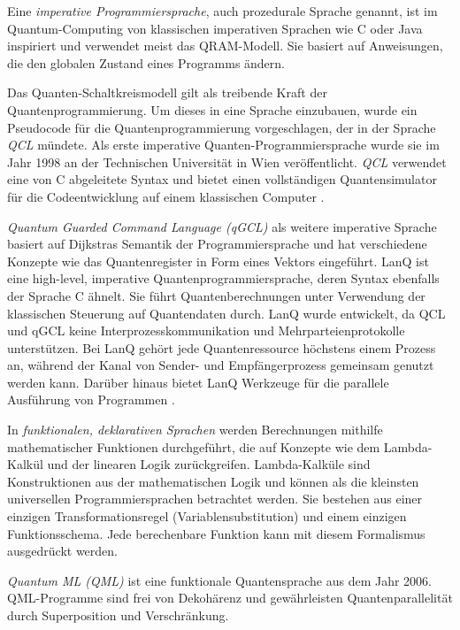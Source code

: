 Eine \textit{imperative Programmiersprache}, auch prozedurale Sprache genannt, ist im Quantum-Computing von klassischen imperativen Sprachen wie C oder Java inspiriert und verwendet meist das QRAM-Modell. Sie basiert auf Anweisungen, die den globalen Zustand eines Programms ändern. \autocite{garhwal_quantum_2021}

Das Quanten-Schaltkreismodell gilt als treibende Kraft der Quantenprogrammierung. Um dieses in eine Sprache einzubauen, wurde ein Pseudocode für die Quantenprogrammierung vorgeschlagen, der in der Sprache \textit{QCL} mündete. Als erste imperative Quanten-Programmiersprache wurde sie im Jahr 1998 an der Technischen Universität in Wien veröffentlicht. \textit{QCL} verwendet eine von C abgeleitete Syntax und bietet einen vollständigen Quantensimulator für die Codeentwicklung auf einem klassischen Computer \autocite{sofgeSurveyQuantumProgramming2008a}.

\textit{Quantum Guarded Command Language (qGCL)} als weitere imperative Sprache basiert auf Dijkstras Semantik der Programmiersprache und hat verschiedene Konzepte wie das Quantenregister in Form eines Vektors eingeführt. LanQ ist eine high-level, imperative Quantenprogrammiersprache, deren Syntax ebenfalls der Sprache C ähnelt. Sie führt Quantenberechnungen unter Verwendung der klassischen Steuerung auf Quantendaten durch. LanQ wurde entwickelt, da QCL und qGCL keine Interprozesskommunikation und Mehrparteienprotokolle unterstützen. Bei LanQ gehört jede Quantenressource höchstens einem Prozess an, während der Kanal von Sender- und Empfängerprozess gemeinsam genutzt werden kann. Darüber hinaus bietet LanQ Werkzeuge für die parallele Ausführung von Programmen \autocite{garhwal_quantum_2021}.

In \textit{funktionalen, deklarativen Sprachen} werden Berechnungen mithilfe mathematischer Funktionen durchgeführt, die auf Konzepte wie dem Lambda-Kalkül und der linearen Logik zurückgreifen. Lambda-Kalküle sind Konstruktionen aus der mathematischen Logik und können als die kleinsten universellen Programmiersprachen betrachtet werden. Sie bestehen aus einer einzigen Transformationsregel (Variablensubstitution) und einem einzigen Funktionsschema. Jede berechenbare Funktion kann mit diesem Formalismus ausgedrückt werden. \autocite{garhwal_quantum_2021}

\textit{Quantum ML (QML)} ist eine funktionale Quantensprache aus dem Jahr 2006. QML-Programme sind frei von Dekohärenz und gewährleisten Quantenparallelität durch Superposition und Verschränkung. \autocite{garhwal_quantum_2021}

